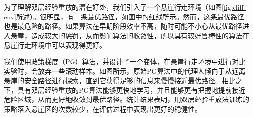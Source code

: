 


为了理解双层经验重放的潜在好处，我们引入了一个悬崖行走环境（如图\ref{fig:cliff-env}所述）。很明显，有一条最优路径，如图中的红线所示。然而，这条最优路径也是最危险的路径。如果算法在早期阶段效率不高，随时可能不小心从最优路径进入悬崖，造成较大的惩罚，从而影响算法的收敛性，所以具有较好鲁棒性的算法在悬崖行走环境中可以表现得更好。

我们使用政策梯度（PG）算法，并设计了一个变体，在悬崖行走环境中进行对比实验时，会放弃一些滚动样本。如图所示，原始PG算法中的代理人倾向于从远离悬崖的安全路径进行探索，直到它获得足够的信息来慢慢接近最优路径。相比之下，具有双层经验重放的PG算法能够更快地学习，并且能够更有把握地提前接近危险区域，从而更好地收敛到最优路径。统计结果表明，用双层经验重放法训练的策略落入悬崖区的次数较少，在评估过程中表现出更好的稳健性。

